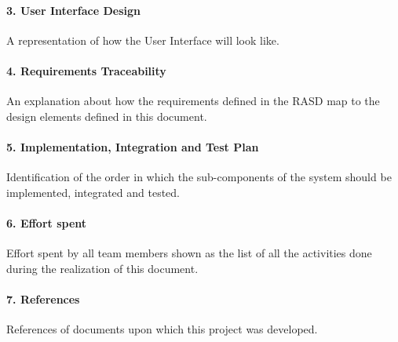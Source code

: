 \documentclass[../DD.tex]{subfiles}
\begin{document}
		\paragraph{3. User Interface Design}
		A representation of how the User Interface will look like.
		\paragraph{4. Requirements Traceability}
		An explanation about how the requirements defined in the RASD map to the design elements defined in this document.
		\paragraph{5. Implementation, Integration and Test Plan}
		Identification of the order in which the sub-components of the system should be implemented, integrated and tested.
		\paragraph{6. Effort spent}
		Effort spent by all team members shown as the list of all the activities done during the realization of this document.
		\paragraph{7. References}
		References of documents upon which this project was developed.
		
		
		
\end{document}
